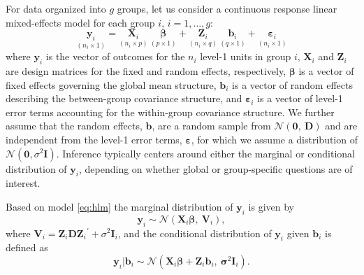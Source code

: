 \documentclass[12pt]{article} %
\newcommand{\trans}{\ensuremath{^\prime}}
\begin{document}
For data organized into $g$ groups, 
let us  consider a continuous response linear mixed-effects model for each group $i$, $i=1, \ldots, g$:
%
\begin{equation}\label{eq:hlm}
	\underset{(n_i \times 1)}{\bm{y}_i} = \underset{(n_i \times p)}{\bm{X}_i} \ \underset{(p \times 1)}{\bm{\beta}} + \underset{(n_i \times q)}{\bm{Z}_i} \ \underset{(q \times 1)}{\bm{b}_i} + \underset{(n_i \times 1)}{\bm{\varepsilon}_i}
\end{equation}
%
where $\bm{y}_i$ is the vector of outcomes for the $n_i$ level-1 units in group $i$, $\bm{X}_i$ and $\bm{Z}_i$ are design matrices for the fixed and random effects, respectively, $\bm{\beta}$ is a vector of fixed effects governing the global mean structure, $\bm{b}_i$ is a vector of random effects describing the between-group covariance structure, and $\bm{\varepsilon}_i$ is a vector of level-1 error terms accounting for the within-group covariance structure. We further assume that the random effects,  $\bm{b}$,  are a random sample from $\mathcal{N}(\bm{0},\ \bm{D})$ and are independent from the level-1 error terms,  $\bm{\varepsilon}$, for which we assume a distribution of $\mathcal{N}(\bm{0},\sigma^2 \bm{I})$. %
Inference typically centers around either the marginal or conditional distribution of $\bm{y}_i$, depending on whether global or group-specific questions are of interest.

Based on model \eqref{eq:hlm} the marginal distribution of $\bm{y}_i$ is given by
%
\begin{equation}\label{eq:marginalmod}
\bm{y}_i \sim \mathcal{N}\left(\bm{X}_i\bm{\beta},\ \bm{V}_i \right),
\end{equation}
%
where $\bm{V}_i = \bm{Z}_i \bm{DZ}_i\trans + \sigma^2 \bm{I}_i$, and the conditional distribution of $\bm{y}_i$ given $\bm{b}_i$ is defined as
%
\begin{equation}\label{eq:conditionalmod}
\bm{y}_i | \bm{b}_i \sim \mathcal{N}\left(\bm{X}_i\bm{\beta} + \bm{Z}_i \bm{b}_i, \ \bm\sigma^2 \bm{I}_i \right).
\end{equation}
%
\end{document}
